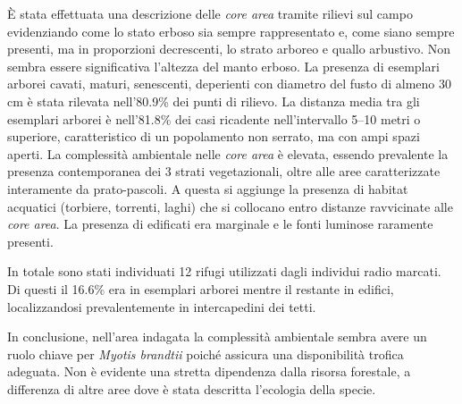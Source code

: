 {È stata effettuata una descrizione delle \textit{core area} tramite rilievi sul campo evidenziando come lo stato erboso sia sempre rappresentato e, come siano sempre presenti, ma in proporzioni decrescenti, lo strato arboreo e quallo arbustivo. Non sembra essere significativa l’altezza del manto erboso.  La presenza di esemplari arborei cavati, maturi, senescenti, deperienti con diametro del fusto di almeno 30 cm è stata rilevata nell’80.9\% dei punti di rilievo. La distanza media tra gli esemplari arborei è nell’81.8\% dei casi ricadente nell’intervallo 5--10 metri o superiore, caratteristico di un popolamento non serrato, ma con ampi spazi aperti. La complessità ambientale nelle \textit{core area} è elevata, essendo prevalente la presenza contemporanea dei 3 strati vegetazionali, oltre alle aree caratterizzate interamente da prato-pascoli. A questa si aggiunge la presenza di habitat acquatici (torbiere, torrenti, laghi) che si collocano entro distanze ravvicinate alle \textit{core area}. La presenza di edificati  era marginale e le fonti luminose raramente presenti.

In totale sono stati individuati 12 rifugi utilizzati dagli individui radio marcati. Di questi il 16.6\% era in esemplari arborei mentre il restante in edifici, localizzandosi prevalentemente in intercapedini dei tetti.

In conclusione, nell’area indagata la complessità ambientale sembra avere un ruolo chiave per \emph{Myotis brandtii} poiché assicura una disponibilità trofica adeguata. Non è evidente una stretta dipendenza dalla risorsa forestale, a differenza di altre aree dove è stata descritta l’ecologia della specie. 
} %